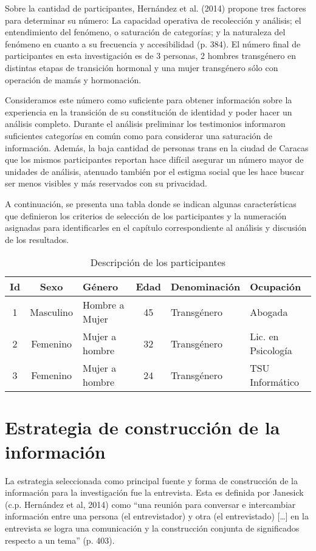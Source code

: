 Sobre la cantidad de participantes, Hernández et al. (2014) propone tres
factores para determinar su número: La capacidad operativa de recolección y
análisis; el entendimiento del fenómeno, o saturación de categorías; y la
naturaleza del fenómeno en cuanto a su frecuencia y accesibilidad (p. 384).
El número final de participantes en esta investigación es de 3 personas, 2
hombres transgénero en distintas etapas de transición hormonal y una mujer
transgénero sólo con operación de mamás y hormonación.

Consideramos este número como suficiente para obtener información sobre la
experiencia en la transición de su constitución de identidad y poder hacer un
análisis completo.
Durante el análisis preliminar los testimonios informaron
suficientes categorías en común como para considerar una saturación de
información.
Además, la baja cantidad de personas trans en la ciudad de Caracas
que los mismos participantes reportan hace difícil asegurar un número mayor de
unidades de análisis, atenuado también por el estigma social que les hace buscar
ser menos visibles y más reservados con su privacidad.

A continuación, se presenta una tabla donde se indican algunas características
que definieron los criterios de selección de los participantes y la numeración
asignadas para identificarles en el capítulo correspondiente al análisis y
discusión de los resultados.

\begin{table}[]
    \caption{Descripción de los participantes}
    \label{tab:participantes}
    \centering
    \renewcommand{\tabcolsep}{1pt}
    \begin{tabularx}{\textwidth}{@{}ccXcXX@{}}
    \toprule
    Id & Sexo & Género         & Edad & Denominación & Ocupación
    \\ \midrule
    1            & Masculino      & Hombre a Mujer & 45   & Transgénero      & Abogada            \\
    2            & Femenino       & Mujer a hombre & 32   & Transgénero      & Lic. en Psicología \\
    3            & Femenino       & Mujer a hombre & 24   & Transgénero      & TSU Informático    \\ \bottomrule
    \end{tabularx}
\end{table}

\section{Estrategia de construcción de la información}
La estrategia seleccionada como principal fuente y forma de construcción de la
información para la investigación fue la entrevista.
Esta es definida por Janesick (c.p. Hernández et al, 2014) como “una reunión
para conversar e intercambiar información entre una persona (el entrevistador) y
otra (el entrevistado) […] en la entrevista se logra una comunicación y la
construcción conjunta de significados respecto a un tema” (p. 403).

